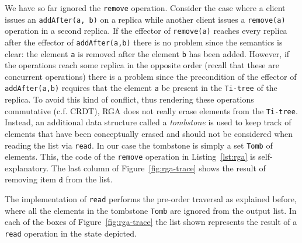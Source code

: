 
We have so far ignored the \lstinline|remove| operation.
%
Consider the case where a client issues an \lstinline|addAfter(a, b)|
on a replica while another client issues a \lstinline|remove(a)|
operation in a second replica.
%
If the effector of \lstinline|remove(a)| reaches every replica after
the effector of \lstinline|addAfter(a,b)| there is no problem since
the semantics is clear: the element \lstinline|a| is removed after
the element \lstinline|b| has been added.
%
However, if the operations reach some replica in the opposite order
(recall that these are concurrent operations) there is a problem since
the precondition of the effector of \lstinline|addAfter(a,b)|
requires that the element \lstinline|a| be present in the
\lstinline|Ti-tree| of the replica.
%
To avoid this kind of conflict, thus rendering these operations
commutative (c.f. CRDT), RGA does not really erase elements from the
\lstinline|Ti-tree|.
%
Instead, an additional data structure called a \emph{tombstone} is used to
keep track of elements that have been conceptually erased and should
not be considered when reading the list via \lstinline|read|.
%
In our case the tombstone is simply a set \lstinline|Tomb| of
elements.
%
This, the code of the \lstinline|remove| operation
in Listing~\ref{lst:rga} is self-explanatory.
%
The last column of Figure~\ref{fig:rga-trace} shows the result of
removing item $\mathtt{d}$ from the list.

The implementation of \lstinline|read| performs the pre-order
traversal as explained before, where all the elements in the tombstone
\lstinline|Tomb| are ignored from the output list.
%
In each of the boxes of Figure~\ref{fig:rga-trace} the list shown
represents the result of a \lstinline|read| operation in the state
depicted.


